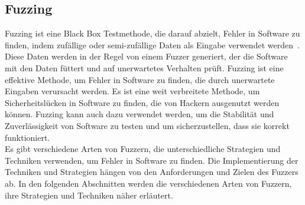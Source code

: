 
\subsection{Fuzzing}\label{subsec:fuzzing}
Fuzzing ist eine Black Box Testmethode, die darauf abzielt, Fehler in Software zu finden, indem zufällige oder
semi-zufällige Daten als Eingabe verwendet werden~\cite{fuzzing}.
Diese Daten werden in der Regel von einem Fuzzer generiert, der die Software mit den Daten füttert und auf unerwartetes Verhalten prüft.
Fuzzing ist eine effektive Methode, um Fehler in Software zu finden, die durch unerwartete Eingaben verursacht werden.
Es ist eine weit verbreitete Methode, um Sicherheitslücken in Software zu finden, die von Hackern ausgenutzt werden können.
Fuzzing kann auch dazu verwendet werden, um die Stabilität und Zuverlässigkeit von Software zu testen und um sicherzustellen,
dass sie korrekt funktioniert. \\
Es gibt verschiedene Arten von Fuzzern, die unterschiedliche Strategien und Techniken verwenden, um Fehler in Software zu finden.
Die Implementierung der Techniken und Strategien hängen von den Anforderungen und Zielen des Fuzzers ab.
In den folgenden Abschnitten werden die verschiedenen Arten von Fuzzern, ihre Strategien und Techniken näher erläutert.




